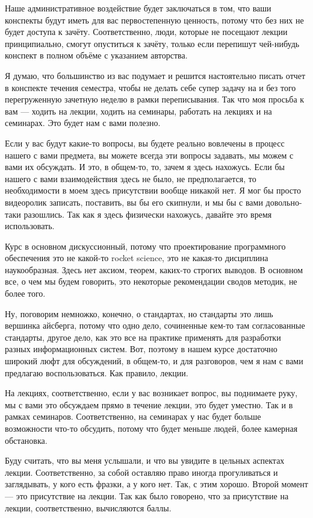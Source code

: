 Наше административное воздействие будет заключаться в том, что ваши конспекты будут иметь для вас первостепенную ценность, потому что без них не будет доступа к зачёту. Соответственно, люди, которые не посещают лекции принципиально, смогут опуститься к зачёту, только если перепишут чей-нибудь конспект в полном объёме с указанием авторства.

Я думаю, что большинство из вас подумает и решится настоятельно писать отчет в конспекте течения семестра, чтобы не делать себе супер задачу на и без того перегруженную зачетную неделю в рамки переписывания. Так что моя просьба к вам --- ходить на лекции, ходить на семинары, работать на лекциях и на семинарах. Это будет нам с вами полезно.

Если у вас будут какие-то вопросы, вы будете реально вовлечены в процесс нашего с вами предмета, вы можете всегда эти вопросы задавать, мы можем с вами их обсуждать. И это, в общем-то, то, зачем я здесь нахожусь. Если бы нашего с вами взаимодействия здесь не было, не предполагается, то необходимости в моем здесь присутствии вообще никакой нет. Я мог бы просто видеоролик записать, поставить, вы бы его скипнули, и мы бы с вами довольно-таки разошлись. Так как я здесь физически нахожусь, давайте это время использовать.

Курс в основном дискуссионный, потому что проектирование программного обеспечения это не какой-то rocket science, это не какая-то дисциплина наукообразная. Здесь нет аксиом, теорем, каких-то строгих выводов. В основном все, о чем мы будем говорить, это некоторые рекомендации сводов методик, не более того.

Ну, поговорим немножко, конечно, о стандартах, но стандарты это лишь вершинка айсберга, потому что одно дело, сочиненные кем-то там согласованные стандарты, другое дело, как это все на практике применять для разработки разных информационных систем. Вот, поэтому в нашем курсе достаточно широкий люфт для обсуждений, в общем-то, и для разговоров, чем я нам с вами предлагаю воспользоваться. Как правило, лекции.

На лекциях, соответственно, если у вас возникает вопрос, вы поднимаете руку, мы с вами это обсуждаем прямо в течение лекции, это будет уместно. Так и в рамках семинаров. Соответственно, на семинарах у нас будет больше возможности что-то обсудить, потому что будет меньше людей, более камерная обстановка. 

Буду считать, что вы меня услышали, и что вы увидите в цельных аспектах лекции. Соответственно, за собой оставляю право иногда прогуливаться и заглядывать, у кого есть фразки, а у кого нет. Так, с этим хорошо. Второй момент --- это присутствие на лекции. Так как было говорено, что за присутствие на лекции, соответственно, вычисляются баллы.

